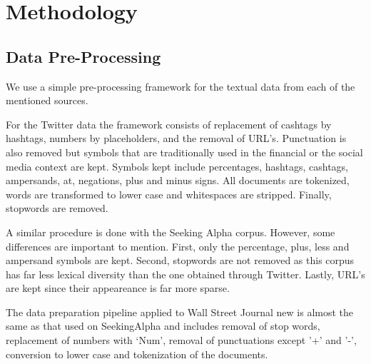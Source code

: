 \documentclass[a4paper, 12pt]{report}
\begin{document}
    
    
    
    
    \chapter{Methodology}
    
    \section{Data Pre-Processing}
    \label{DataPreProc}
    We use a simple pre-processing framework for the textual data from each of the mentioned sources.
    
    For the Twitter data the framework consists of replacement of cashtags by hashtags, numbers by placeholders, and the removal of URL's. Punctuation is also removed but symbols that are traditionally used in the financial or the social media context are kept. Symbols kept include percentages, hashtags, cashtags, ampersands, at, negations, plus and minus signs. All documents are tokenized, words are transformed to lower case and whitespaces are stripped. Finally, stopwords are removed. 
    
    A similar procedure is done with the Seeking Alpha corpus. However, some differences are important to mention. First, only the percentage, plus, less and ampersand symbols are kept. Second, stopwords are not removed as this corpus has far less lexical diversity than the one obtained through Twitter. Lastly, URL's are kept since their appeareance is far more sparse.
    
    The data preparation pipeline applied to Wall Street Journal new is almost the same as that used on SeekingAlpha and includes removal of stop words, replacement of numbers with ‘Num’, removal of punctuations except '+' and '-', conversion to lower case and tokenization of the documents.
    
\end{document}
